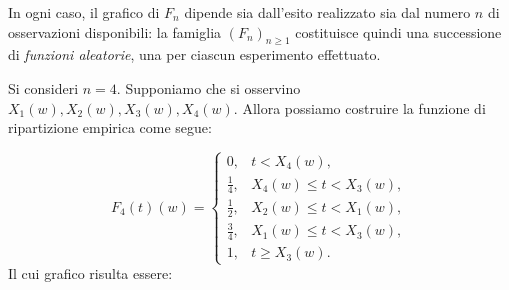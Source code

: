 \bigskip
\noindent 
In ogni caso, il grafico di $F_n$ dipende sia dall’esito realizzato sia dal numero
$n$ di osservazioni disponibili: la famiglia $(F_n)_{n\ge 1}$ costituisce quindi
una successione di \emph{funzioni aleatorie}, una per ciascun esperimento
effettuato.

\begin{esempio}
    Si consideri $n=4$. Supponiamo che si osservino $X_1(w), X_2(w), X_3(w), X_4(w)$. Allora possiamo costruire la funzione di ripartizione empirica come segue:

    \[
    F_4(t)(w)=
    \begin{cases}
    0, & t < X_{4}(w),\\[4pt]
    \frac14, & X_{4}(w) \le t < X_{3}(w),\\[4pt]
    \frac12, & X_{2}(w) \le t < X_{1}(w),\\[4pt]
    \frac34, & X_{1}(w) \le t < X_{3}(w),\\[4pt]
    1, & t \ge X_{3}(w).
    \end{cases}
    \]
    Il cui grafico risulta essere:
    \begin{figure}[H]
        \centering
    \end{figure}
\end{esempio}

